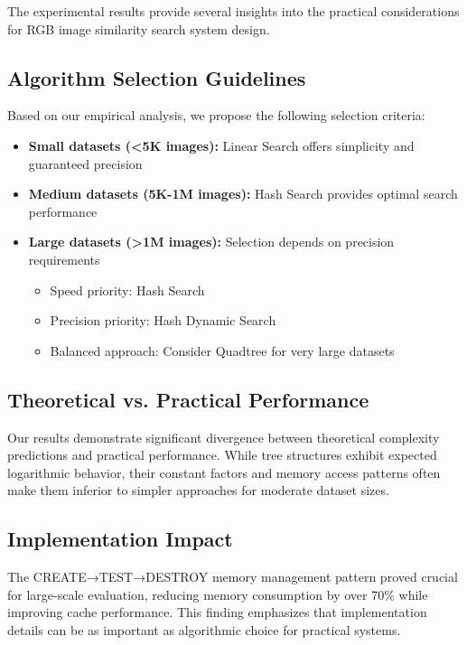 \documentclass{sbc2023}
\begin{document}
The experimental results provide several insights into the practical considerations for RGB image similarity search system design.

\subsection{Algorithm Selection Guidelines}

Based on our empirical analysis, we propose the following selection criteria:

\begin{itemize}
    \item \textbf{Small datasets (<5K images):} Linear Search offers simplicity and guaranteed precision
    
    \item \textbf{Medium datasets (5K-1M images):} Hash Search provides optimal search performance
    
    \item \textbf{Large datasets (>1M images):} Selection depends on precision requirements
    \begin{itemize}
        \item Speed priority: Hash Search
        \item Precision priority: Hash Dynamic Search  
        \item Balanced approach: Consider Quadtree for very large datasets
    \end{itemize}
\end{itemize}

\subsection{Theoretical vs. Practical Performance}

Our results demonstrate significant divergence between theoretical complexity predictions and practical performance. While tree structures exhibit expected logarithmic behavior, their constant factors and memory access patterns often make them inferior to simpler approaches for moderate dataset sizes.

\subsection{Implementation Impact}

The CREATE→TEST→DESTROY memory management pattern proved crucial for large-scale evaluation, reducing memory consumption by over 70\% while improving cache performance. This finding emphasizes that implementation details can be as important as algorithmic choice for practical systems.
\end{document}
